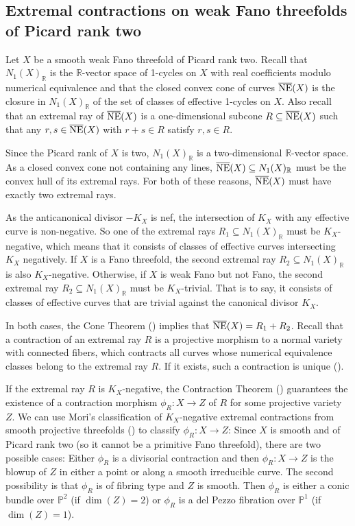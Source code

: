 \documentclass[english,11pt,reqno]{amsart}
\newcommand{\sub}{\subseteq}
\newcommand{\Pone}{\mathbb{P}^1}
\newcommand{\Ptwo}{\mathbb{P}^2}
\newcommand{\R}{\mathbb{R}}
\newcommand{\NE}{\overline{\textup{NE}}}
\begin{document}
\subsection{Extremal contractions on weak Fano threefolds of Picard rank two} \label{subsection:extremal_contractions}
%
Let $X$ be a smooth weak Fano threefold of Picard rank two. Recall that $N_1(X)_{\R}$ is the $\R$-vector space of 1-cycles on $X$ with real coefficients modulo numerical equivalence and that the closed convex cone of curves $\NE(X)$ is the closure in $N_1(X)_{\R}$ of the set of classes of effective 1-cycles on $X$. Also recall that an extremal ray of $\NE(X)$ is a one-dimensional subcone $R \sub \NE(X)$ such that any $r,s\in \NE(X)$ with $r+s\in R$ satisfy $r,s\in R$. \par 
Since the Picard rank of $X$ is two, $N_1(X)_{\R}$ is a two-dimensional $\R$-vector space. As a closed convex cone not containing any lines, $\NE(X)\sub N_1(X)_{\R}$ must be the convex hull of its extremal rays. For both of these reasons, $\NE(X)$ must have exactly two extremal rays.\par 
As the anticanonical divisor $-K_X$ is nef, the intersection of $K_X$ with any effective curve is non-negative. So one of the extremal rays $R_1\sub N_1(X)_{\R}$ must be $K_X$-negative, which means that it consists of classes of effective curves intersecting $K_X$ negatively. If $X$ is a Fano threefold, the second extremal ray $R_2\sub N_1(X)_{\R}$ is also $K_X$-negative. Otherwise, if $X$ is weak Fano but not Fano, the second extremal ray $R_2\sub N_1(X)_{\R}$ must be $K_X$-trivial. That is to say, it consists of classes of effective curves that are trivial against the canonical divisor $K_X$. \par 
In both cases, the Cone Theorem (\cite[Thm.\ 6.1]{Debarre-Higher_dimensional_Alg_Geom}) implies that $\NE(X)=R_1+R_2$. Recall that a contraction of an extremal ray $R$ is a projective morphism to a normal variety with connected fibers, which contracts all curves whose numerical equivalence classes belong to the extremal ray $R$. If it exists, such a contraction is unique (\cite[6.11]{Kollar-Intro_to_Moris_Program}).\par 
If the extremal ray $R$ is $K_X$-negative, the Contraction Theorem (\cite[Thm.\ 7.39]{Debarre-Higher_dimensional_Alg_Geom}) guarantees the existence of a contraction morphism $\phi_R:X\rightarrow Z$ of $R$ for some projective variety $Z$. We can use Mori's classification of $K_X$-negative extremal contractions from smooth projective threefolds (\cite[Thm.\ 3.3-3.5]{Mori-Extremal_contractions_threefolds}) to classify $\phi_R:X\rightarrow Z$: Since $X$ is smooth and of Picard rank two (so it cannot be a primitive Fano threefold), there are two possible cases: Either $\phi_R$ is a divisorial contraction and then $\phi_R:X\rightarrow Z$ is the blowup of $Z$ in either a point or along a smooth irreducible curve. The second possibility is that $\phi_R$ is of fibring type and $Z$ is smooth. Then $\phi_R$ is either a conic bundle over $\Ptwo$ (if $\dim(Z)=2$) or $\phi_R$ is a del Pezzo fibration over $\Pone$ (if $\dim(Z)=1$).   \par
\end{document}
